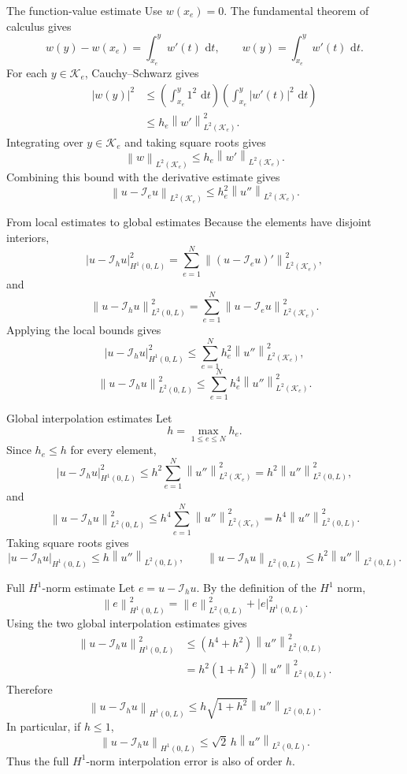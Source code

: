 \documentclass[11pt,aspectratio=169]{beamer}
\newcommand{\dd}{\,\mathrm{d}}
\newcommand{\Ih}{\mathcal I_h}
\newcommand{\Ie}{\mathcal I_e}
\newcommand{\norm}[2][]{\left\lVert#2\right\rVert_{#1}}
\newcommand{\seminorm}[2][]{\left\lvert#2\right\rvert_{#1}}
\begin{document}
\begin{frame}{The function-value estimate}
Use $w(x_e)=0$. The fundamental theorem of calculus gives
\[
  w(y)-w(x_e)=\int_{x_e}^{y}w'(t)\,\dd t,
  \qquad
  w(y)=\int_{x_e}^{y}w'(t)\,\dd t.
\]
For each $y\in\mathcal K_e$, Cauchy--Schwarz gives
\begin{align*}
  |w(y)|^2
  &\leq
  \left(\int_{x_e}^{y}1^2\,\dd t\right)
  \left(\int_{x_e}^{y}|w'(t)|^2\,\dd t\right)\\
  &\leq h_e\norm[L^2(\mathcal K_e)]{w'}^2.
\end{align*}
Integrating over $y\in\mathcal K_e$ and taking square roots gives
\[
  \norm[L^2(\mathcal K_e)]{w}
  \leq h_e\norm[L^2(\mathcal K_e)]{w'}.
\]
Combining this bound with the derivative estimate gives
\[
  \boxed{\norm[L^2(\mathcal K_e)]{u-\Ie u}
  \leq h_e^2\norm[L^2(\mathcal K_e)]{u''}.
  }
\]
\end{frame}

\begin{frame}{From local estimates to global estimates}
Because the elements have disjoint interiors,
\[
  \seminorm[H^1(0,L)]{u-\Ih u}^2
  =\sum_{e=1}^{N}
  \norm[L^2(\mathcal K_e)]{(u-\Ie u)'}^2,
\]
and
\[
  \norm[L^2(0,L)]{u-\Ih u}^2
  =\sum_{e=1}^{N}
  \norm[L^2(\mathcal K_e)]{u-\Ie u}^2.
\]
Applying the local bounds gives
\[
  \seminorm[H^1(0,L)]{u-\Ih u}^2
  \leq\sum_{e=1}^{N}h_e^2
  \norm[L^2(\mathcal K_e)]{u''}^2,
\]
\[
  \norm[L^2(0,L)]{u-\Ih u}^2
  \leq\sum_{e=1}^{N}h_e^4
  \norm[L^2(\mathcal K_e)]{u''}^2.
\]
\end{frame}

\begin{frame}{Global interpolation estimates}
Let
\[
  h=\max_{1\leq e\leq N}h_e.
\]
Since $h_e\leq h$ for every element,
\[
  \seminorm[H^1(0,L)]{u-\Ih u}^2
  \leq h^2\sum_{e=1}^{N}
  \norm[L^2(\mathcal K_e)]{u''}^2
  =h^2\norm[L^2(0,L)]{u''}^2,
\]
and
\[
  \norm[L^2(0,L)]{u-\Ih u}^2
  \leq h^4\sum_{e=1}^{N}
  \norm[L^2(\mathcal K_e)]{u''}^2
  =h^4\norm[L^2(0,L)]{u''}^2.
\]
Taking square roots gives
\[
  \boxed{
  \seminorm[H^1(0,L)]{u-\Ih u}
  \leq h\norm[L^2(0,L)]{u''},
  \qquad
  \norm[L^2(0,L)]{u-\Ih u}
  \leq h^2\norm[L^2(0,L)]{u''}.}
\]
\end{frame}

\begin{frame}{Full \texorpdfstring{$H^1$}{H1}-norm estimate}
Let $e=u-\Ih u$. By the definition of the $H^1$ norm,
\[
  \norm[H^1(0,L)]{e}^2
  =\norm[L^2(0,L)]{e}^2
  +\seminorm[H^1(0,L)]{e}^2.
\]
Using the two global interpolation estimates gives
\begin{align*}
  \norm[H^1(0,L)]{u-\Ih u}^2
  &\leq
  \left(h^4+h^2\right)\norm[L^2(0,L)]{u''}^2\\
  &=h^2\left(1+h^2\right)\norm[L^2(0,L)]{u''}^2.
\end{align*}
Therefore
\[
  \boxed{
  \norm[H^1(0,L)]{u-\Ih u}
  \leq h\sqrt{1+h^2}\norm[L^2(0,L)]{u''}.}
\]
In particular, if $h\leq1$,
\[
  \norm[H^1(0,L)]{u-\Ih u}
  \leq\sqrt{2}\,h\norm[L^2(0,L)]{u''}.
\]
Thus the full $H^1$-norm interpolation error is also of order $h$.
\end{frame}
\end{document}
